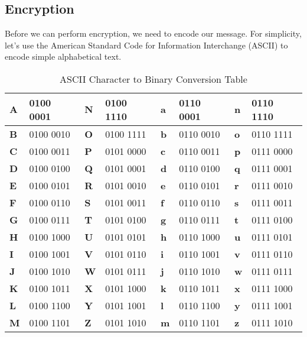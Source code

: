 \subsection{Encryption}
Before we can perform encryption, we need to encode our message. For simplicity, let's use the American Standard Code for Information Interchange (ASCII) to encode simple alphabetical text.

\begin{table}[H]
    \centering
    \begin{tabular}{|l|l|l|l|l|l|l|l|}
        \hline
        \textbf{A} & 0100 0001 & \textbf{N} & 0100 1110 & \textbf{a} & 0110 0001 & \textbf{n} & 0110 1110 \\ \hline
        \textbf{B} & 0100 0010 & \textbf{O} & 0100 1111 & \textbf{b} & 0110 0010 & \textbf{o} & 0110 1111 \\ \hline
        \textbf{C} & 0100 0011 & \textbf{P} & 0101 0000 & \textbf{c} & 0110 0011 & \textbf{p} & 0111 0000 \\ \hline
        \textbf{D} & 0100 0100 & \textbf{Q} & 0101 0001 & \textbf{d} & 0110 0100 & \textbf{q} & 0111 0001 \\ \hline
        \textbf{E} & 0100 0101 & \textbf{R} & 0101 0010 & \textbf{e} & 0110 0101 & \textbf{r} & 0111 0010 \\ \hline
        \textbf{F} & 0100 0110 & \textbf{S} & 0101 0011 & \textbf{f} & 0110 0110 & \textbf{s} & 0111 0011 \\ \hline
        \textbf{G} & 0100 0111 & \textbf{T} & 0101 0100 & \textbf{g} & 0110 0111 & \textbf{t} & 0111 0100 \\ \hline
        \textbf{H} & 0100 1000 & \textbf{U} & 0101 0101 & \textbf{h} & 0110 1000 & \textbf{u} & 0111 0101 \\ \hline
        \textbf{I} & 0100 1001 & \textbf{V} & 0101 0110 & \textbf{i} & 0110 1001 & \textbf{v} & 0111 0110 \\ \hline
        \textbf{J} & 0100 1010 & \textbf{W} & 0101 0111 & \textbf{j} & 0110 1010 & \textbf{w} & 0111 0111 \\ \hline
        \textbf{K} & 0100 1011 & \textbf{X} & 0101 1000 & \textbf{k} & 0110 1011 & \textbf{x} & 0111 1000 \\ \hline
        \textbf{L} & 0100 1100 & \textbf{Y} & 0101 1001 & \textbf{l} & 0110 1100 & \textbf{y} & 0111 1001 \\ \hline
        \textbf{M} & 0100 1101 & \textbf{Z} & 0101 1010 & \textbf{m} & 0110 1101 & \textbf{z} & 0111 1010 \\ \hline
    \end{tabular}
    \caption{ASCII Character to Binary Conversion Table}\label{table-ASCII-conversion-table}
\end{table}

